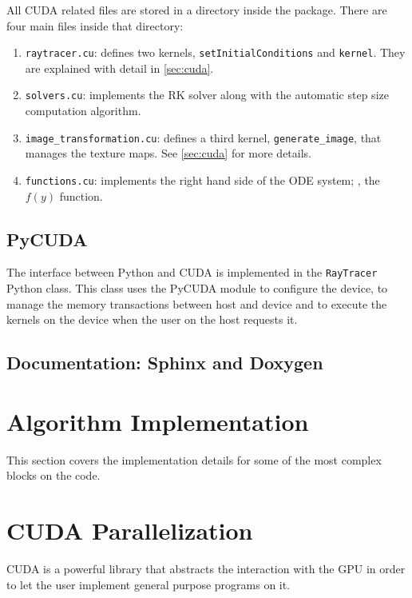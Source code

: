 All \ac{CUDA} related files are stored in a directory inside the package. There are four main files inside that directory:
\begin{enumerate}
	\item \lstinline{raytracer.cu}: defines two kernels, \lstinline{setInitialConditions} and \lstinline{kernel}. They are explained with detail in \autoref{sec:cuda}.
	\item \lstinline{solvers.cu}: implements the \ac{RK} solver along with the automatic step size computation algorithm.
	\item \lstinline{image_transformation.cu}: defines a third kernel, \lstinline{generate_image}, that manages the texture maps. See \autoref{sec:cuda} for more details.
	\item \lstinline{functions.cu}: implements the right hand side of the \ac{ODE} system; \ie, the $f(y)$ function.
\end{enumerate}

\subsection{PyCUDA}

The interface between Python and \ac{CUDA} is implemented in the \lstinline{RayTracer} Python class. This class uses the PyCUDA module to configure the device, to manage the memory transactions between host and device and to execute the kernels on the device when the user on the host requests it.

\subsection{Documentation: Sphinx and Doxygen}

\section{Algorithm Implementation}

This section covers the implementation details for some of the most complex blocks on the code.

\section{CUDA Parallelization}
\label{sec:cuda}

\ac{CUDA} is a powerful library that abstracts the interaction with the \ac{GPU} in order to let the user implement general purpose programs on it.

